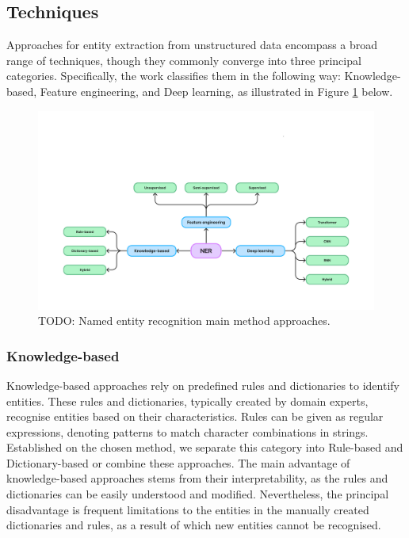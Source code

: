 \subsection{Techniques}
\label{subsec:Techniques}
Approaches for entity extraction from unstructured data encompass a broad range of techniques, though they commonly converge into three principal categories. Specifically, the work \parencite{keraghel2024survey} classifies them in the following way: Knowledge-based, Feature engineering, and Deep learning, as illustrated in Figure \ref{fig:named-entity-recognition-methods} below.

\begin{figure}[H]
    \centering
    \includegraphics[width=\textwidth]{img/ner-methods.pdf}
    \caption{TODO: Named entity recognition main method approaches.}
    \label{fig:named-entity-recognition-methods}
\end{figure}

\subsubsection*{Knowledge-based}
\label{subsubsec:knowledge-based}
Knowledge-based approaches rely on predefined rules and dictionaries to identify entities. These rules and dictionaries, typically created by domain experts, recognise entities based on their characteristics. Rules can be given as regular expressions, denoting patterns to match character combinations in strings. Established on the chosen method, we separate this category into Rule-based and Dictionary-based or combine these approaches. The main advantage of knowledge-based approaches stems from their interpretability, as the rules and dictionaries can be easily understood and modified. Nevertheless, the principal disadvantage is frequent limitations to the entities in the manually created dictionaries and rules, as a result of which new entities cannot be recognised.


